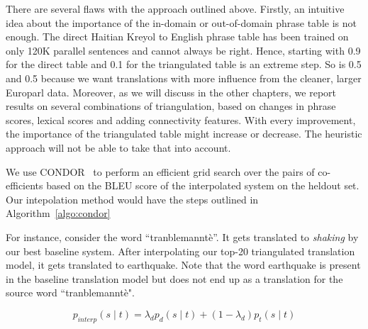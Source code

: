 		There are several flaws with the approach outlined above. Firstly, an intuitive idea about the importance of the in-domain or out-of-domain phrase table is not enough. The direct Haitian Kreyol to English phrase table has been trained on only 120K parallel sentences and cannot always be right. Hence, starting with 0.9 for the direct table and 0.1 for the triangulated table is an extreme step. So is 0.5 and 0.5 because we want translations with more influence from the cleaner, larger Europarl data. Moreover, as we will discuss in the other chapters, we report results on several combinations of triangulation, based on changes in phrase scores, lexical scores and adding connectivity features. With every improvement, the importance of the triangulated table might increase or decrease. The heuristic approach will not be able to take that into account. 

		We use CONDOR~\cite{condor-practice} to perform an efficient grid search over the pairs of co-efficients based on the BLEU score of the interpolated system on the heldout set. Our intepolation method would have the steps outlined in Algorithm~\ref{algo:condor}
 
		
        For instance, consider the word ``tranblemannt\`e''. It gets translated to \emph{shaking} by our best baseline system. After interpolating our top-20 triangulated translation model, it gets translated to earthquake. Note that the word earthquake is present in the baseline translation model but does not end up as a translation for the source word ``tranblemannt\`e".


        \begin{equation} \label{eq:interpolation}
                p_{interp}(s \mid t) = \lambda_{d} p_{d}(s \mid t) + (1 - \lambda_{d}) p_{t}(s \mid t)
        \end{equation}

